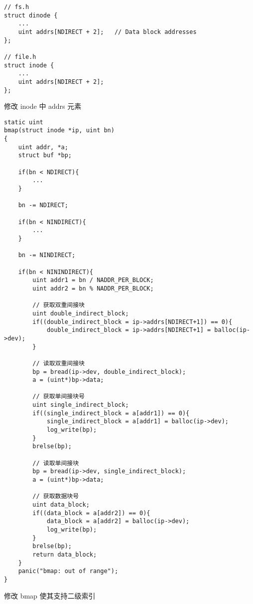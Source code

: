 \begin{listing}[!htb]
	\begin{verbatim}
// fs.h
struct dinode {
    ...
    uint addrs[NDIRECT + 2];   // Data block addresses
};

// file.h
struct inode {
    ...
    uint addrs[NDIRECT + 2];
};

	\end{verbatim}
	\caption{修改 inode 中 addrs 元素}\label{lst:modify_inode_addr}
\end{listing}

\begin{listing}[!htb]
	\begin{verbatim}
static uint
bmap(struct inode *ip, uint bn)
{
    uint addr, *a;
    struct buf *bp;
    
    if(bn < NDIRECT){
        ...
    }
    
    bn -= NDIRECT;
    
    if(bn < NINDIRECT){
        ...
    }
    
    bn -= NINDIRECT;

    if(bn < NININDIRECT){
        uint addr1 = bn / NADDR_PER_BLOCK;
        uint addr2 = bn % NADDR_PER_BLOCK;
        
        // 获取双重间接块
        uint double_indirect_block;
        if((double_indirect_block = ip->addrs[NDIRECT+1]) == 0){
            double_indirect_block = ip->addrs[NDIRECT+1] = balloc(ip->dev);
        }
        
        // 读取双重间接块
        bp = bread(ip->dev, double_indirect_block);
        a = (uint*)bp->data;
        
        // 获取单间接块号
        uint single_indirect_block;
        if((single_indirect_block = a[addr1]) == 0){
            single_indirect_block = a[addr1] = balloc(ip->dev);
            log_write(bp);
        }
        brelse(bp);
        
        // 读取单间接块
        bp = bread(ip->dev, single_indirect_block);
        a = (uint*)bp->data;
        
        // 获取数据块号
        uint data_block;
        if((data_block = a[addr2]) == 0){
            data_block = a[addr2] = balloc(ip->dev);
            log_write(bp);
        }
        brelse(bp);
        return data_block;
    }
    panic("bmap: out of range");
}
	\end{verbatim}
	\caption{修改 bmap 使其支持二级索引}\label{lst:bmap}
\end{listing}

